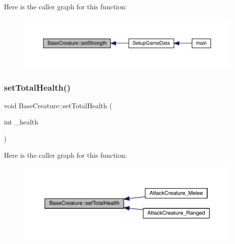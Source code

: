 Here is the caller graph for this function\+:
\nopagebreak
\begin{figure}[H]
\begin{center}
\leavevmode
\includegraphics[width=350pt]{class_base_creature_a3a2eb318b9c5d849a02884b20e32f83d_icgraph}
\end{center}
\end{figure}
\mbox{\label{class_base_creature_a82f847585033035597700b071e40611f}} 
\subsubsection{\texorpdfstring{set\+Total\+Health()}{setTotalHealth()}}
{\footnotesize\ttfamily void Base\+Creature\+::set\+Total\+Health (\begin{DoxyParamCaption}\item[{int}]{\+\_\+health }\end{DoxyParamCaption})}

Here is the caller graph for this function\+:
\nopagebreak
\begin{figure}[H]
\begin{center}
\leavevmode
\includegraphics[width=350pt]{class_base_creature_a82f847585033035597700b071e40611f_icgraph}
\end{center}
\end{figure}
\mbox{\label{class_base_creature_ae1cb6e6d01d0c369433fb1fb20803f91}} 
